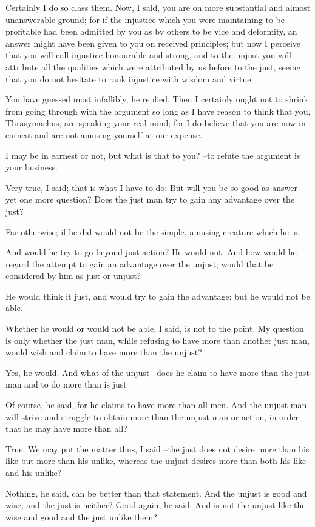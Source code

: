 Certainly I do so class them.
Now, I said, you are on more substantial and almost unanswerable ground; for if the injustice which you were maintaining to be profitable had been admitted by you as by others to be vice and deformity, an answer might have been given to you on received principles; but now I perceive that you will call injustice honourable and strong, and to the unjust you will attribute all the qualities which were attributed by us before to the just, seeing that you do not hesitate to rank injustice with wisdom and virtue.

You have guessed most infallibly, he replied.
Then I certainly ought not to shrink from going through with the argument so long as I have reason to think that you, Thrasymachus, are speaking your real mind; for I do believe that you are now in earnest and are not amusing yourself at our expense.

I may be in earnest or not, but what is that to you? --to refute the argument is your business.

Very true, I said; that is what I have to do: But will you be so good as answer yet one more question? Does the just man try to gain any advantage over the just?

Far otherwise; if he did would not be the simple, amusing creature which he is.

And would he try to go beyond just action?
He would not.
And how would he regard the attempt to gain an advantage over the unjust; would that be considered by him as just or unjust?

He would think it just, and would try to gain the advantage; but he would not be able.

Whether he would or would not be able, I said, is not to the point. My question is only whether the just man, while refusing to have more than another just man, would wish and claim to have more than the unjust?

Yes, he would.
And what of the unjust --does he claim to have more than the just man and to do more than is just

Of course, he said, for he claims to have more than all men.
And the unjust man will strive and struggle to obtain more than the unjust man or action, in order that he may have more than all?

True.
We may put the matter thus, I said --the just does not desire more than his like but more than his unlike, whereas the unjust desires more than both his like and his unlike?

Nothing, he said, can be better than that statement.
And the unjust is good and wise, and the just is neither?
Good again, he said.
And is not the unjust like the wise and good and the just unlike them?

